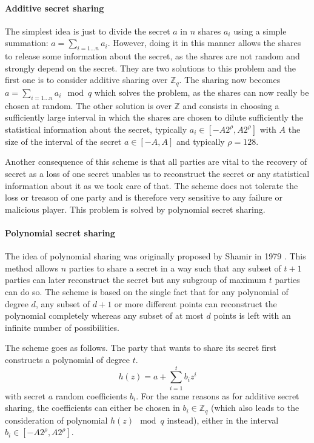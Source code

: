 \paragraph{Additive secret sharing}
The simplest idea is just to divide the secret $a$ in $n$ shares $a_i$ using a simple summation: $a = \sum_{i=1 \ldots n}a_i$. However, doing it in this manner allows the shares to release some information about the secret, as the shares are not random and strongly depend on the secret. They are two solutions to this problem and the first one is to consider additive sharing over $\mathbb{Z}_q$. The sharing now becomes $a = \sum_{i=1\ldots n}a_i \mod q$ which solves the problem, as the shares can now really be chosen at random. The other solution is over $\mathbb{Z}$ and consists in choosing a sufficiently large interval in which the shares are chosen to dilute sufficiently the statistical information about the secret, typically $a_i \in \left[-A2^\rho,A2^\rho\right]$ with $A$ the size of the interval of the secret $a \in \left[-A,A\right]$ and typically $\rho=128$.

Another consequence of this scheme is that all parties are vital to the recovery of secret as a loss of one secret unables us to reconstruct the secret or any statistical information about it as we took care of that. The scheme does not tolerate the loss or treason of one party and is therefore very sensitive to any failure or malicious player. This problem is solved by polynomial secret sharing.



\paragraph{Polynomial secret sharing}
The idea of polynomial sharing was originally proposed by Shamir in 1979 \cite{Shamir1979HowSecret}. This method allows $n$ parties to share a secret in a way such that any subset of $t+1$ parties can later reconstruct the secret but any subgroup of maximum $t$ parties can do so. The scheme is based on the single fact that for any polynomial of degree $d$, any subset of $d+1$ or more different points can reconstruct the polynomial completely whereas any subset of at most $d$ points is left with an infinite number of possibilities.

The scheme goes as follows. The party that wants to share its secret first constructs a polynomial of degree $t$.
\begin{equation}
    h(z) = a + \sum_{i=1}^t b_i z^i
\end{equation}
with secret $a$ random coefficients $b_i$. For the same reasons as for additive secret sharing, the coefficients can either be chosen in $b_i \in \mathbb{Z}_q$ (which also leads to the consideration of polynomial $h(z) \mod q$ instead), either in the interval $b_i \in \left[-A2^\rho,A2^\rho\right]$.

